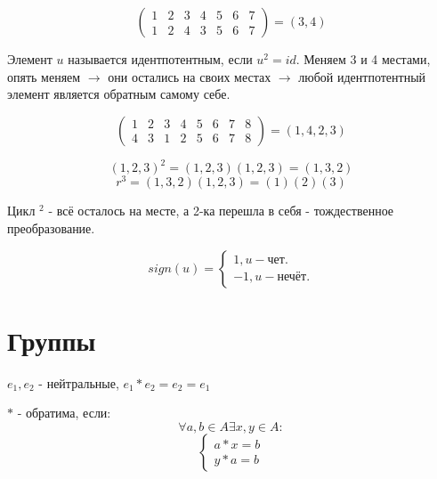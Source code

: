 \begin{exmp}[Транспозиция]
	\[
	\begin{pmatrix}
		1 & 2 & 3 & 4 & 5 & 6 & 7 \\
		1 & 2 & 4 & 3 & 5 & 6 & 7
	\end{pmatrix}
	=
	(3,4)
	\]
\end{exmp}

\begin{definition}
	Элемент $u$ называется идентпотентным, если $u^2 = id$. Меняем 3 и 4 местами, опять меняем $\to$ они остались на своих местах $\to$ любой идентпотентный элемент является обратным самому себе.
\end{definition}

\[
	\begin{pmatrix}
		1 & 2 & 3 & 4 & 5 & 6 & 7 & 8 \\
		4 & 3 & 1 & 2 & 5 & 6 & 7 & 8
	\end{pmatrix}
	=
	(1, 4, 2, 3)
\]

\[ (1,2,3)^2 = (1,2,3)(1,2,3) = (1,3,2) \]
\[ r^3 = (1,3,2)(1,2,3) = (1)(2)(3) \]

Цикл $^2$ - всё осталось на месте, а 2-ка перешла в себя - тождественное преобразование.

\[ sign(u) =
\begin{cases}
	1, u - \text{чет.} \\
	-1, u - \text{нечёт.}
\end{cases}
\]

\section{Группы}

\begin{definition}
	$e_1, e_2$ - нейтральные, $e_1 * e_2 = e_2 = e_1$
\end{definition}

$*$ - обратима, если:
\[ \forall a, b \in A \exists x, y \in A: \]
\[
\begin{cases}
	a * x = b \\
	y * a = b
\end{cases}
\]



\newpage

\tableofcontents

